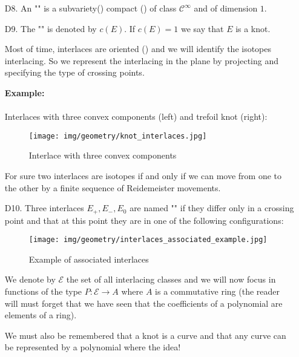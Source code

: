 {\begin{enumerate}
		\item[D8.] An "" is a subvariety() compact () of class $\mathcal{C}^\infty$ and of dimension $1$.
		
		\item[D9.] The "" is denoted by $c(E)$. If $c(E)=1$ we say that $E$ is a knot.
		
		Most of time, interlaces are oriented () and we will identify the isotopes interlacing. So we represent the interlacing in the plane by projecting and specifying the type of crossing points.
		
		\begin{tcolorbox}[colframe=black,colback=white,sharp corners]
		\textbf{{\Large {}}Example:}\\\\
		Interlaces with three convex components (left) and trefoil knot (right):
		\begin{figure}[H]
			\centering
			\texttt{[image: img/geometry/knot\_interlaces.jpg]}
			\caption{Interlace with three convex components}
		\end{figure}
		\end{tcolorbox}
		For sure two interlaces are isotopes if and only if we can move from one to the other by a finite sequence of Reidemeister movements.
		
		\item[D10.] Three interlaces $E_+,E_{-},E_0$ are named "" if they differ only in a crossing point and that at this point they are in one of the following configurations:
		\begin{figure}[H]
			\centering
			\texttt{[image: img/geometry/interlaces\_associated\_example.jpg]}
			\caption{Example of associated interlaces}
		\end{figure}
		We denote by $\mathcal{E}$ the set of all interlacing classes and we will now focus in functions of the type $P:\mathcal{E}\rightarrow A$ where $A$ is a commutative ring (the reader will must forget that we have seen that the coefficients of a polynomial are elements of a ring).
		
		\begin{tcolorbox}[title=Remark,colframe=black,arc=10pt]
		We must also be remembered that a knot is a curve and that any curve can be represented by a polynomial where the idea!
		\end{tcolorbox}
		

\end{enumerate}}
